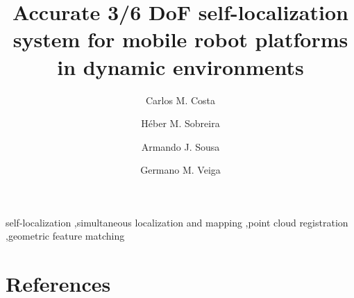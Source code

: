 










\begin{frontmatter}

\title{Accurate 3/6 DoF self-localization system for mobile robot platforms in dynamic environments}


\author[inesc-address]{Carlos M. Costa}

\author[inesc-address]{Héber M. Sobreira}

\author[inesc-address]{Armando J. Sousa}

\author[inesc-address]{Germano M. Veiga}

\address[inesc-address]{INESC TEC, Rua Dr. Roberto Frias, 4200-465 Porto, Portugal}


%



\begin{keyword}
self-localization \sep simultaneous localization and mapping \sep point cloud registration \sep geometric feature matching
\end{keyword}

\end{frontmatter}













\section*{References}






